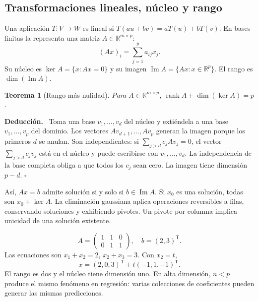 \documentclass[11pt,a4paper]{article}
\newcommand{\R}{\mathbb R}
\newcommand{\T}{^{\mathsf T}}
\newenvironment{deduccion}{\par\textbf{Deducción.}\ }{\hfill$\square$\par}
\DeclareMathOperator{\rank}{rank}
\DeclareMathOperator{\kerop}{ker}
\DeclareMathOperator{\range}{Im}
\newtheorem{teorema}{Teorema}[section]
\theoremstyle{definition}
\begin{document}
\subsection{Transformaciones lineales, núcleo y rango}
Una aplicación $T:V\to W$ es lineal si $T(au+bv)=aT(u)+bT(v)$. En bases finitas la representa una matriz $A\in\R^{m\times p}$:
\[
(Ax)_i=\sum_{j=1}^p a_{ij}x_j.
\]
Su núcleo es $\kerop A=\{x:Ax=0\}$ y su imagen $\range A=\{Ax:x\in\R^p\}$. El rango es $\dim(\range A)$.
\begin{teorema}[Rango más nulidad]
Para $A\in\R^{m\times p}$, $\rank A+\dim(\kerop A)=p$.
\end{teorema}
\begin{deduccion}
Toma una base $v_1,\ldots,v_d$ del núcleo y extiéndela a una base $v_1,\ldots,v_p$ del dominio. Los vectores $Av_{d+1},\ldots,Av_p$ generan la imagen porque los primeros $d$ se anulan. Son independientes: si $\sum_{j>d}c_jAv_j=0$, el vector $\sum_{j>d}c_jv_j$ está en el núcleo y puede escribirse con $v_1,\ldots,v_d$. La independencia de la base completa obliga a que todos los $c_j$ sean cero. La imagen tiene dimensión $p-d$.
\end{deduccion}
Así, $Ax=b$ admite solución si y solo si $b\in\range A$. Si $x_0$ es una solución, todas son $x_0+\kerop A$. La eliminación gaussiana aplica operaciones reversibles a filas, conservando soluciones y exhibiendo pivotes. Un pivote por columna implica unicidad de una solución existente.
\begin{ejemplo}
\[
A=\begin{pmatrix}1&1&0\\0&1&1\end{pmatrix},\quad b=(2,3)\T.
\]
Las ecuaciones son $x_1+x_2=2$, $x_2+x_3=3$. Con $x_2=t$,
\[
x=(2,0,3)\T+t(-1,1,-1)\T.
\]
El rango es dos y el núcleo tiene dimensión uno. En alta dimensión, $n<p$ produce el mismo fenómeno en regresión: varias colecciones de coeficientes pueden generar las mismas predicciones.
\end{ejemplo}
\end{document}
